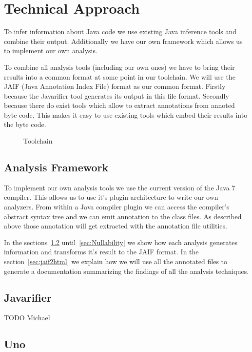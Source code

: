 \section{Technical Approach}
To infer information about Java code we use existing Java inference tools and 
combine their output. Additionally we have our own framework which allows us to
implement our own analysis. 

To combine all analysis tools (including our own ones) we have to bring 
their results into a common format at some point in our toolchain. 
We will use the JAIF (Java Annotation Index File) format as our common format. 
Firstly because the Javarifier tool generates its output in this file format. 
Secondly because there do exist tools which allow to extract annotations from 
annoted byte code. This makes it easy to use existing tools which embed their 
results into the byte code.

\begin{figure}
\centering
{}
\caption{Toolchain}
\label{fig:toolchain}
\end{figure}

\subsection{Analysis Framework}
\label{ss:analysisFramework}

To implement our own analysis tools we use the current version of the Java 7 compiler.
This allows us to use it's plugin architecture to write our own analyzers. From within
a Java compiler plugin we can access the compiler's abstract syntax tree and we can emit 
annotation to the class files. As described above those annotation will get extracted 
with the annotation file utilities.

In the sections~\ref{sec:Javarifier} until~\ref{sec:Nullability} we show how each analysis 
generates information and transforms it's result to the JAIF format. In the section~\ref{sec:jaif2html}
we explain how we will use all the annotated files to generate a documentation summarizing
the findings of all the analysis techniques.

\subsection{Javarifier}
\label{sec:Javarifier}
TODO Michael


\subsection{Uno}

